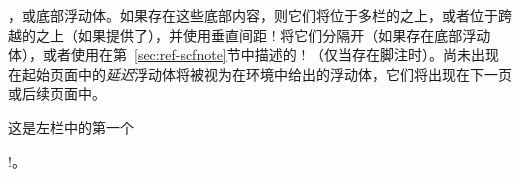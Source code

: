 ，或底部浮动体。如果存在这些底部内容，则它们将位于多栏的之上，或者位于跨越的之上（如果提供了），并使用垂直间距 \!\textfloatsep! 将它们分隔开（如果存在底部浮动体），或者使用在第~\ref{sec:ref-scfnote}节中描述的 \!\belowfootnoteskip! （仅当存在脚注时）。尚未出现在起始页面中的\emph{延迟}浮动体将被视为在环境中给出的\pwise{}浮动体，它们将出现在下一页或后续页面中。
% 


% 

这是左栏中的第一个 \!\item!。


% 

